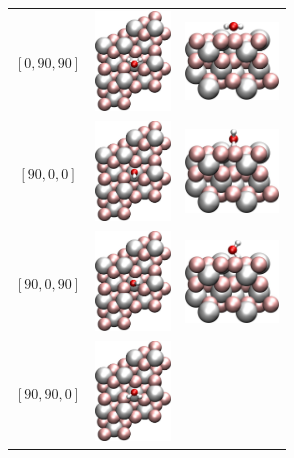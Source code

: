 \documentclass[11pt,DIV=13,BCOR=5mm,a4paper,headinclude]{scrbook}
\begin{document}
\begin{table}[!h]
\begin{tabular}{cp{4cm}p{4cm}}
$[0, 90, 90]$ & \includegraphics[width=2cm,angle=90]{figures/0001/Ausrichtungsbilder/0_90_90-toptest.png} 
& \includegraphics[width=2.5cm]{figures/0001/Ausrichtungsbilder/0_90_90-sidetest.png}\\
$[90, 0, 0]$ &\includegraphics[width=2cm,angle=90]{figures/0001/Ausrichtungsbilder/90_0_0-toptest.png} 
& \includegraphics[width=2.5cm]{figures/0001/Ausrichtungsbilder/90_0_0-sidetest.png}\\
$[90, 0, 90]$ & \includegraphics[width=2cm,angle=90]{figures/0001/Ausrichtungsbilder/90_0_90-toptest.png} 
& \includegraphics[width=2.5cm]{figures/0001/Ausrichtungsbilder/90_0_90-sidetest.png}\\
$[90, 90, 0]$ &\includegraphics[width=2cm,angle=90]{figures/0001/Ausrichtungsbilder/90_90_0-toptest.png} 

\end{tabular}
\end{table}
\end{document}
